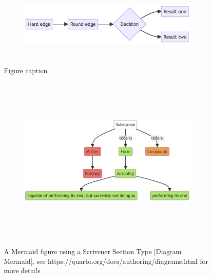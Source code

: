 \documentclass[
  12pt,
  a4paper,
  oneside,
  numbers=noenddot,
  titlepage,
  toclink=all,
  toc=bibliography]{scrbook}
\theoremstyle{definition}
\theoremstyle{definition}
\theoremstyle{definition}
\theoremstyle{plain}
\theoremstyle{plain}
\theoremstyle{plain}
\theoremstyle{plain}
\theoremstyle{plain}
\theoremstyle{remark}
\begin{document}
\begin{figure}

{\centering 

\begin{figure}[H]

{\centering \includegraphics[width=5.73in,height=1.39in]{index_files/figure-latex/mermaid-figure-3.png}

}

\end{figure}

}

\caption{\label{fig-scriv16B}Figure caption}

\end{figure}

\hypertarget{fig-scriv17}{}
\begin{figure}

\begin{figure}[H]

{\centering \includegraphics[width=6.65in,height=3.32in]{index_files/figure-latex/mermaid-figure-2.png}

}

\end{figure}

\label{fig-scriv17}A Mermaid figure using a Scrivener Section Type
{[}Diagram Mermaid{]}, see
https://quarto.org/docs/authoring/diagrams.html for more details

\end{figure}
\end{document}
